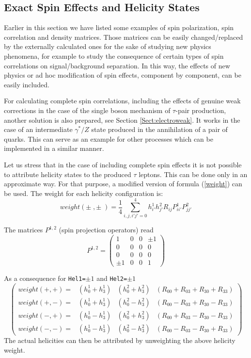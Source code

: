 \documentclass[]{Tauola_interface_design}
\begin{document}
\subsection{Exact Spin Effects and Helicity States}
\label{Exact}
Earlier in this section  we have listed some examples of spin polarization, 
spin correlation and density matrices. Those matrices can be easily 
changed/replaced by the externally calculated ones
for the sake of studying new physics phenomena, for example to study
the consequence of certain types of spin correlations on signal/background
separation. In this  way, the effects of 
new physics or ad hoc modification of spin effects, component by component,
can be easily included.

For calculating complete spin correlations, including the effects 
of genuine weak corrections in the case of the single boson mechanism of $\tau$-pair production, 
another solution 
is also prepared, see  Section \ref{Sect:electroweak}.
It works in the  case of  an intermediate  $\gamma^*/Z$ state  
 produced in the annihilation of a pair of quarks.  This can serve as an example for other processes
which can be implemented in a similar manner.

Let us stress that in the case of including complete spin effects
 it is not possible to attribute helicity states to the produced $\tau$ leptons.
This can be done only  in an approximate way. For that purpose,
a modified version of formula (\ref{weight}) can be used.
The weight 
for each helicity configuration is:
\begin{equation}
weight(\pm\;,\pm\;)=\displaystyle \frac{1}{4} \sum_{i,j,i'j'=0}^{4} h^1_{i'} h^2_{j'} R_{ij} P^1_{ii'} P^2_{jj'}
\label{weights}
\end{equation}


The matrices $P^{1,2}$ (spin projection operators) read
\[P^{1,2}=\begin{pmatrix} 
1 & 0 & 0 & \pm 1 \\
0 & 0 & 0 & 0 \\
0 & 0 & 0 & 0 \\
\pm 1 & 0 & 0 & 1 
\end{pmatrix}\]


 
As a consequence for {\tt Hel1=}$\pm 1$ and {\tt Hel2=}$\pm 1$
\[\begin{pmatrix} 
weight(+,+)= & (h^1_{0}+ h^1_{3}) & (h^2_{0}+ h^2_{3}) & (R_{00}+R_{03}+R_{30}+R_{33}) \\
weight(+,-)= & (h^1_{0}+ h^1_{3}) & (h^2_{0}- h^2_{3}) & (R_{00}-R_{03}+R_{30}-R_{33}) \\
weight(-,+)= & (h^1_{0}- h^1_{3}) & (h^2_{0}+ h^2_{3}) & (R_{00}+R_{03}-R_{30}-R_{33}) \\
weight(-,-)= & (h^1_{0}- h^1_{3}) & (h^2_{0}- h^2_{3}) & (R_{00}-R_{03}-R_{30}+R_{33})
\end{pmatrix}\]
The actual helicities can then be attributed by unweighting the above helicity weight.
\end{document}
